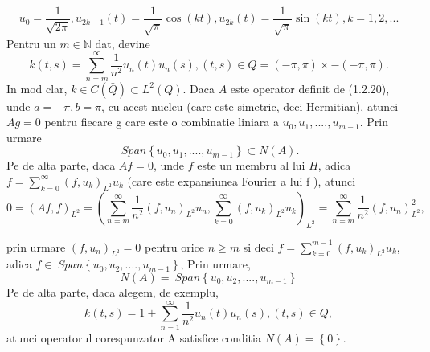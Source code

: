 \documentclass[a4paper,12pt,oneside]{report}
\begin{document}
	\begin{displaymath}
		u_{0} = \frac{1}{\sqrt{2\pi }}, u_{2k-1}\left ( t \right ) = \frac{1}{\sqrt{\pi }}\cos \left ( kt \right ),
		u_{2k}\left ( t \right ) = \frac{1}{\sqrt{\pi }}\sin\left ( kt \right ), k= 1,2,...
	\end{displaymath}
	Pentru un \(m\in \mathbb{N}\) dat, devine 
	\begin{displaymath}
		k\left ( t,s \right ) = \sum_{n=m}^{\infty }\frac{1}{n^{2}}u_{n}\left ( t \right )u_{n}\left ( s \right ), \left ( t,s \right )\in Q = \left ( -\pi ,\pi  \right )\times -\left ( -\pi ,\pi  \right ).
	\end{displaymath}
	In mod clar, \(k\in C\left ( \bar{Q} \right )\subset L^{2}\left ( Q \right )\). Daca \(A\) este operator definit de (1.2.20), unde \(a = -\pi, b = \pi\), cu acest nucleu (care este simetric, deci Hermitian), atunci \(Ag=0\) pentru fiecare g care este o combinatie liniara a \(u_{0}, u_{1},....,u_{m-1}\). Prin urmare
	\begin{displaymath}
		\ Span \left \{ u_{0}, u_{1},....,u_{m-1} \right \} \subset N\left ( A \right ). 
	\end{displaymath}
	Pe de alta parte, daca \(Af=0\), unde \(f\) este un membru al lui \(H\), adica \(f = \sum_{k=0}^{\infty }\left ( f,u_{k} \right )_{L^{2}}u_{k}\) (care este expansiunea Fourier a lui f ), atunci 
	\begin{displaymath}
		0 = \left ( Af,f \right )_{L^{2}} = \left (\sum_{n=m}^{\infty }\frac{1}{n^{2}}\left ( f,u_{n} \right )_{L^{2}}u_{n}, \sum_{k=0}^{\infty }\left ( f,u_{k} \right )_{L^{2}}u_{k}  \right )_{L^{2}} = \sum_{n=m}^{\infty }\frac{1}{n^{2}}\left ( f,u_{n} \right )_{L^{2}}^{2},
	\end{displaymath}
					
	prin urmare \(\left ( f,u_{n} \right )_{L^{2}} = 0\) pentru orice \(n\geq m\) si deci \(f = \sum_{k=0}^{m-1}\left ( f,u_{k} \right )_{L^{2}}u_{k}\), adica \(f\in \ Span \left \{ u_{0}, u_{2},....,u_{m-1} \right \}\), Prin urmare,
	\begin{displaymath}
		N\left ( A \right ) = \ Span \left \{ u_{0}, u_{2},....,u_{m-1} \right \}
	\end{displaymath}
	Pe de alta parte, daca alegem, de exemplu,
	\begin{displaymath}
		k\left ( t,s \right ) = 1+ \sum_{n=1}^{\infty }\frac{1}{n^{2}}u_{n}\left ( t \right )u_{n}\left ( s \right ), \left ( t,s \right )\in Q, 
	\end{displaymath}
	atunci operatorul corespunzator A satisfice conditia \(N\left ( A \right ) = \left \{ 0 \right \} \). 
					
\end{document}

